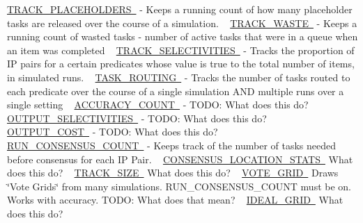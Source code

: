  \mbox{\hyperlink{namespacedynamicfilterapp_1_1toggles_a2be074e9eca6d662578ca68c95050ad3}{T\+R\+A\+C\+K\+\_\+\+P\+L\+A\+C\+E\+H\+O\+L\+D\+E\+RS }} -\/ Keeps a running count of how many placeholder tasks are released over the course of a simulation. ~\newline
 \mbox{\hyperlink{namespacedynamicfilterapp_1_1toggles_ab80874aebf30b9d13f7928d5ecbd6ae2}{T\+R\+A\+C\+K\+\_\+\+W\+A\+S\+TE }} -\/ Keeps a running count of wasted tasks -\/ number of active tasks that were in a queue when an item was completed ~\newline
 \mbox{\hyperlink{namespacedynamicfilterapp_1_1toggles_acc098c8abb66db6192e90e5b54413c39}{T\+R\+A\+C\+K\+\_\+\+S\+E\+L\+E\+C\+T\+I\+V\+I\+T\+I\+ES }} -\/ Tracks the proportion of IP pairs for a certain predicates whose value is true to the total number of items, in simulated runs. ~\newline
 \mbox{\hyperlink{namespacedynamicfilterapp_1_1toggles_a267ac7f08878f62c6031a8fb38aa695b}{T\+A\+S\+K\+\_\+\+R\+O\+U\+T\+I\+NG }} -\/ Tracks the number of tasks routed to each predicate over the course of a single simulation A\+ND multiple runs over a single setting ~\newline
 \mbox{\hyperlink{namespacedynamicfilterapp_1_1toggles_ae898ca1b1c4681151406ecc2921a738b}{A\+C\+C\+U\+R\+A\+C\+Y\+\_\+\+C\+O\+U\+NT }} -\/ T\+O\+DO\+: What does this do? ~\newline
 \mbox{\hyperlink{namespacedynamicfilterapp_1_1toggles_ac8f124f313b63d29e1664ff5fc7a049f}{O\+U\+T\+P\+U\+T\+\_\+\+S\+E\+L\+E\+C\+T\+I\+V\+I\+T\+I\+ES }} -\/ T\+O\+DO\+: What does this do? ~\newline
 \mbox{\hyperlink{namespacedynamicfilterapp_1_1toggles_a2c3c37ecd0a669270751ba1fcdc0439f}{O\+U\+T\+P\+U\+T\+\_\+\+C\+O\+ST }} -\/ T\+O\+DO\+: What does this do? ~\newline
 \mbox{\hyperlink{namespacedynamicfilterapp_1_1toggles_ab852b5e6373777202ed3eabdf511f026}{R\+U\+N\+\_\+\+C\+O\+N\+S\+E\+N\+S\+U\+S\+\_\+\+C\+O\+U\+NT }} -\/ Keeps track of the number of tasks needed before consensus for each IP Pair. ~\newline
 \mbox{\hyperlink{namespacedynamicfilterapp_1_1toggles_ad7f3dbdec359eb538bf1890793d541ad}{C\+O\+N\+S\+E\+N\+S\+U\+S\+\_\+\+L\+O\+C\+A\+T\+I\+O\+N\+\_\+\+S\+T\+A\+TS }} What does this do? ~\newline
 \mbox{\hyperlink{namespacedynamicfilterapp_1_1toggles_a2051e4cd9bae895351ea7a73696fd815}{T\+R\+A\+C\+K\+\_\+\+S\+I\+ZE }} What does this do? ~\newline
 \mbox{\hyperlink{namespacedynamicfilterapp_1_1toggles_abd2acb6c03d6ca650537592475fc69e4}{V\+O\+T\+E\+\_\+\+G\+R\+ID }} Draws \char`\"{}\+Vote Grids\char`\"{} from many simulations. R\+U\+N\+\_\+\+C\+O\+N\+S\+E\+N\+S\+U\+S\+\_\+\+C\+O\+U\+NT must be on. Works with accuracy. T\+O\+DO\+: What does that mean? ~\newline
 \mbox{\hyperlink{namespacedynamicfilterapp_1_1toggles_a42311c82a77ac3b1c03bf7b9c6619be2}{I\+D\+E\+A\+L\+\_\+\+G\+R\+ID }} What does this do? ~\newline
